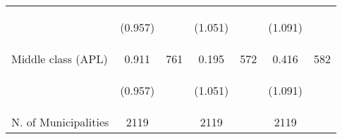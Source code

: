 \begin{tabular}{lcccccc}
\vspace{4pt} &  \begin{footnotesize}(0.957)\end{footnotesize}   & &
			    \begin{footnotesize}(1.051)\end{footnotesize}   & &
			    \begin{footnotesize}(1.091)\end{footnotesize}   &
			     \\

Middle class (APL)  &  0.911   &  761  &   0.195  &  572 &  0.416  &  582   \\


\vspace{4pt} &  \begin{footnotesize}(0.957)\end{footnotesize}   & &
			    \begin{footnotesize}(1.051)\end{footnotesize}   & &
			    \begin{footnotesize}(1.091)\end{footnotesize}   &
			     \\

N. of Municipalities   &   2119   & &    2119 &    &  2119  &   \\
\hline	


\end{tabular}%
